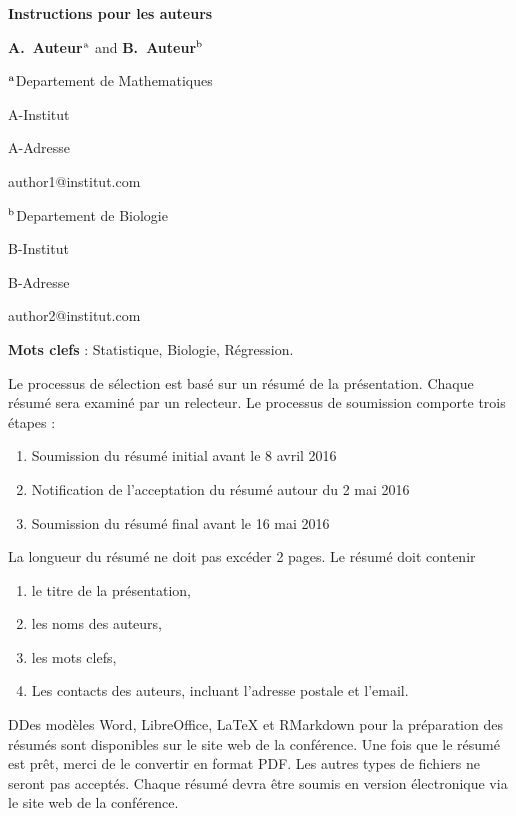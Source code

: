 \documentclass[12pt]{article}
\begin{document}
\centerline{\bf Instructions pour les auteurs}

\vspace{12pt}

\centerline{ {\bf A.~Auteur}$^{\rm a}$ and {\bf B.~Auteur}$^{\rm b}$}

\vspace{12pt}

\centerline{$^{\rm a}$Departement de Mathematiques}
\centerline{A-Institut}
\centerline{A-Adresse}
\centerline{author1@institut.com}

\vspace{12pt}

\centerline{$^{\rm b}$Departement de Biologie}
\centerline{B-Institut}
\centerline{B-Adresse}
\centerline{author2@institut.com}

\vspace{24pt}

{\bf Mots clefs} : Statistique, Biologie, R\'egression.

\vspace{24pt}

Le processus de s\'election est bas\'e sur un r\'esum\'e de la pr\'esentation. Chaque r\'esum\'e sera examin\'e par un relecteur. Le processus de soumission comporte trois \'etapes :
\begin{enumerate}
\item Soumission du r\'esum\'e initial avant le 8 avril 2016
\item Notification de l'acceptation du r\'esum\'e autour du 2 mai 2016
\item Soumission du r\'esum\'e final avant le 16 mai 2016
\end{enumerate}

\vspace{12pt}

La longueur du r\'esum\'e ne doit pas exc\'eder 2 pages. Le r\'esum\'e doit contenir
\begin{enumerate}
\item  le titre de la pr\'esentation,
\item  les noms des auteurs,
\item  les mots clefs,
\item  Les contacts des auteurs, incluant l'adresse postale et l'email.
\end{enumerate}

DDes modèles Word, LibreOffice, LaTeX et RMarkdown pour la pr\'eparation des 
r\'esum\'es sont disponibles sur le site web de la conf\'erence. Une fois que 
le r\'esum\'e est pr\^et, merci de le convertir en format PDF. Les autres types 
de fichiers ne seront pas accept\'es. Chaque r\'esum\'e devra \^etre soumis en 
version \'electronique via le site web de la conf\'erence.
\end{document}
